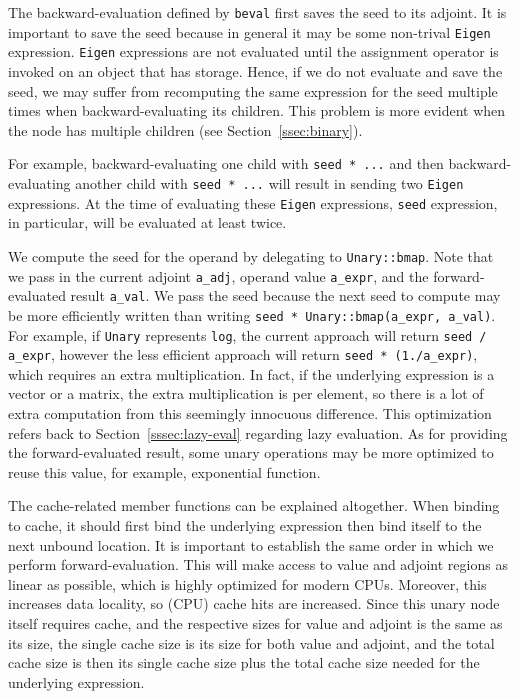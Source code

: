 The backward-evaluation defined by \verb|beval| first saves the seed to its adjoint.
It is important to save the seed because in general it may be some 
non-trival \verb|Eigen| expression.
\verb|Eigen| expressions are not evaluated until the assignment operator
is invoked on an object that has storage.
Hence, if we do not evaluate and save the seed,
we may suffer from recomputing the same expression for the seed multiple times 
when backward-evaluating its children.
This problem is more evident when the node has multiple children (see Section~\ref{ssec:binary}).

For example, backward-evaluating one child with \verb|seed * ...| and
then backward-evaluating another child with \verb|seed * ...| will 
result in sending two \verb|Eigen| expressions.
At the time of evaluating these \verb|Eigen| expressions, 
\verb|seed| expression, in particular, will be evaluated at least twice.
\fi

We compute the seed for the operand by delegating to \verb|Unary::bmap|.
Note that we pass in the current adjoint \verb|a_adj|, 
operand value \verb|a_expr|, and 
the forward-evaluated result \verb|a_val|.
We pass the seed because the next seed to compute may be more efficiently written 
than writing \verb|seed * Unary::bmap(a_expr, a_val)|.
For example, if \verb|Unary| represents \verb|log|,
the current approach will return \verb|seed / a_expr|, however
the less efficient approach will return \verb|seed * (1./a_expr)|,
which requires an extra multiplication.
In fact, if the underlying expression is a vector or a matrix,
the extra multiplication is per element, so there is a lot of extra computation
from this seemingly innocuous difference.
This optimization refers back to Section~\ref{sssec:lazy-eval} regarding lazy evaluation.
As for providing the forward-evaluated result, 
some unary operations may be more optimized to reuse this value,
for example, exponential function.

The cache-related member functions can be explained altogether.
When binding to cache, it should first bind the underlying 
expression then bind itself to the next unbound location.
It is important to establish the same order in which we perform forward-evaluation.
This will make access to value and adjoint regions as linear as possible,
which is highly optimized for modern CPUs.
Moreover, this increases data locality, so (CPU) cache hits are increased.
Since this unary node itself requires cache,
and the respective sizes for value and adjoint is the same as its size,
the single cache size is its size for both value and adjoint,
and the total cache size is then its single cache size plus
the total cache size needed for the underlying expression.


